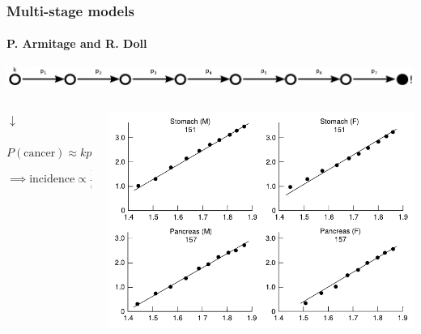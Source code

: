 \documentclass{beamer}
\begin{document}
\begin{frame}
    \frametitle{Multi-stage models}
    \framesubtitle{P. Armitage and R. Doll\footnotemark}


    \begin{center}
        \includegraphics[width=\textwidth]{figures/diagram2b}
    \end{center}
    \begin{columns}
        \begin{column}{0.5\textwidth}
        \begin{center}
            $\downarrow$
        \end{center}
        \begin{equation*}
            P(\mathrm{cancer}) \approx k p_1 p_2 p_3 p_4 p_5 p_6 p_7 \frac{t^7}{7!}
        \end{equation*}
        \begin{equation*}
            \implies \mathrm{incidence} \propto \frac{t^6}{6!}
        \end{equation*}
        \end{column}
        \begin{column}{0.5\textwidth}
        \includegraphics[width=\textwidth]{figures/PArmitageRDoll_1954_6602297.pdf}
        \end{column}
    \end{columns}

\end{frame}
\end{document}
